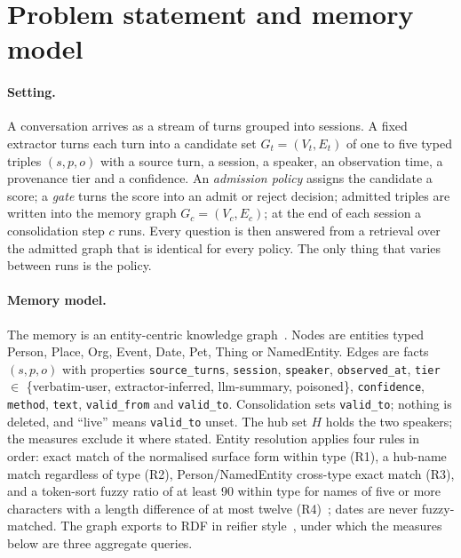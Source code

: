 \documentclass{ceurart}
\newcommand{\Gc}{G_c}
\newcommand{\Gt}{G_t}
\newcommand{\Ec}{E_c}
\newcommand{\Et}{E_t}
\newcommand{\Vc}{V_c}
\newcommand{\Vt}{V_t}
\newcommand{\Hub}{H}
\newcommand{\cons}{c}
\newcommand{\code}[1]{\texttt{#1}}
\begin{document}
\section{Problem statement and memory model}
\label{sec:model}

\paragraph{Setting.} A conversation arrives as a stream of turns grouped into sessions. A fixed extractor turns each turn into a candidate set $\Gt=(\Vt,\Et)$ of one to five typed triples $(s,p,o)$ with a source turn, a session, a speaker, an observation time, a provenance tier and a confidence. An \emph{admission policy} assigns the candidate a score; a \emph{gate} turns the score into an admit or reject decision; admitted triples are written into the memory graph $\Gc=(\Vc,\Ec)$; at the end of each session a consolidation step $\cons$ runs. Every question is then answered from a retrieval over the admitted graph that is identical for every policy. The only thing that varies between runs is the policy.

\paragraph{Memory model.} The memory is an entity-centric knowledge graph~\cite{hogan2021kg}. Nodes are entities typed Person, Place, Org, Event, Date, Pet, Thing or NamedEntity. Edges are facts $(s,p,o)$ with properties \code{source\_turns}, \code{session}, \code{speaker}, \code{observed\_at}, \code{tier} $\in$ \{verbatim-user, extractor-inferred, llm-summary, poisoned\}, \code{confidence}, \code{method}, \code{text}, \code{valid\_from} and \code{valid\_to}. Consolidation sets \code{valid\_to}; nothing is deleted, and ``live'' means \code{valid\_to} unset. The hub set $\Hub$ holds the two speakers; the measures exclude it where stated. Entity resolution applies four rules in order: exact match of the normalised surface form within type (R1), a hub-name match regardless of type (R2), Person/NamedEntity cross-type exact match (R3), and a token-sort fuzzy ratio of at least 90 within type for names of five or more characters with a length difference of at most twelve (R4)~\cite{bachmann2021rapidfuzz}; dates are never fuzzy-matched. The graph exports to RDF in reifier style~\cite{w3c2026rdf12}, under which the measures below are three aggregate queries.
\end{document}
